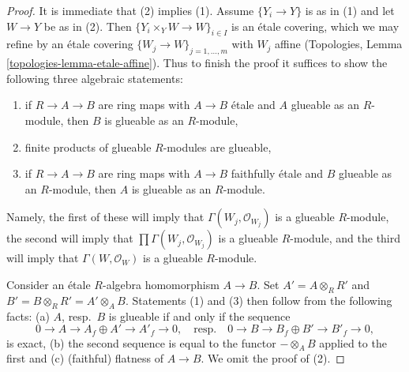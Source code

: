 \documentclass[10pt,a4paper]{amsart}
\theoremstyle{plain}
\theoremstyle{definition}
\theoremstyle{remark}
\numberwithin{equation}{subsection}
\begin{document}
\begin{proof}
It is immediate that (2) implies (1). Assume $\{Y_i \to Y\}$
is as in (1) and let $W \to Y$ be as in (2). Then
$\{Y_i \times_Y W \to W\}_{i \in I}$ is an \'etale covering,
which we may refine by an \'etale covering
$\{W_j \to W\}_{j = 1, \ldots, m}$ with $W_j$ affine
(Topologies, Lemma \ref{topologies-lemma-etale-affine}).
Thus to finish the proof it suffices to show
the following three algebraic statements:
\begin{enumerate}
\item if $R \to A \to B$ are ring maps with $A \to B$ \'etale
and $A$ glueable as an $R$-module, then $B$ is glueable as an
$R$-module,
\item finite products of glueable $R$-modules are glueable,
\item if $R \to A \to B$ are ring maps with $A \to B$ faithfully \'etale
and $B$ glueable as an $R$-module, then $A$ is glueable as an
$R$-module.
\end{enumerate}
Namely, the first of these will imply that $\Gamma(W_j, \mathcal{O}_{W_j})$
is a glueable $R$-module, the second will imply that
$\prod \Gamma(W_j, \mathcal{O}_{W_j})$ is a glueable $R$-module, and
the third will imply that $\Gamma(W, \mathcal{O}_W)$ is a glueable
$R$-module.

\medskip\noindent
Consider an \'etale $R$-algebra homomorphism $A \to B$. Set
$A' = A \otimes_R R'$ and $B' = B \otimes_R R' = A' \otimes_A B$.
Statements (1) and (3) then follow from the following facts:
(a) $A$, resp.\ $B$ is glueable if and only if the sequence
$$
0 \to A \to A_f \oplus A' \to A'_f \to 0,
\quad\text{resp.}\quad
0 \to B \to B_f \oplus B' \to B'_f \to 0,
$$
is exact, (b) the second sequence is equal to
the functor $- \otimes_A B$ applied to the first and
(c) (faithful) flatness of $A \to B$. We omit the proof of (2).
\end{proof}
\end{document}
